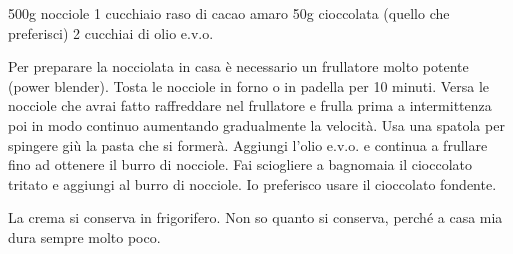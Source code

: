\serves{-}%
\begin{ingreds}
	500g nocciole 
	1 cucchiaio raso di cacao amaro 
	50g cioccolata (quello che preferisci)   
	2 cucchiai di olio e.v.o. 


\end{ingreds}

\begin{method}
	Per preparare la nocciolata in casa è necessario un frullatore molto potente (power blender). Tosta le nocciole in forno o in padella per 10 minuti. Versa le nocciole che avrai fatto raffreddare nel frullatore e frulla prima a intermittenza poi in modo continuo aumentando gradualmente la velocità. Usa una spatola per spingere giù la pasta che si formerà. Aggiungi l'olio e.v.o. e continua a frullare fino ad ottenere il burro di nocciole. Fai sciogliere a bagnomaia il cioccolato tritato e aggiungi al burro di nocciole. Io preferisco usare il cioccolato fondente.

	La crema si conserva in frigorifero. Non so quanto si conserva, perché a casa mia dura sempre molto poco.


\end{method}




